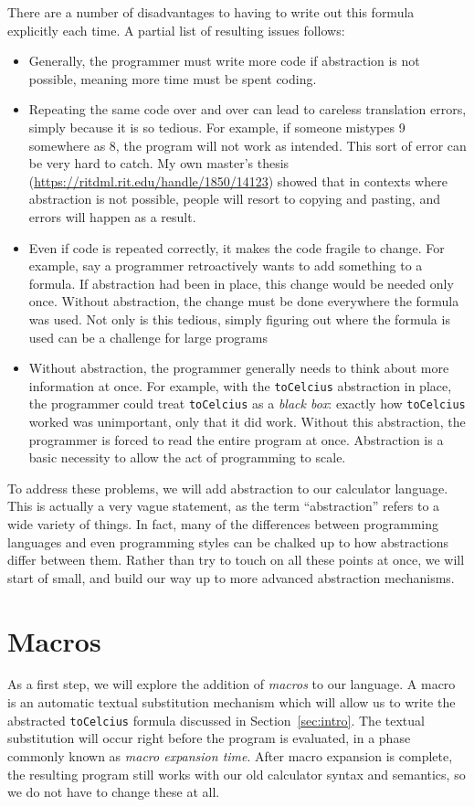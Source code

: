 \documentclass[nocopyrightspace]{sigplanconf}
\begin{document}
There are a number of disadvantages to having to write out this formula explicitly each time.
A partial list of resulting issues follows:
\begin{itemize}
  \item Generally, the programmer must write more code if abstraction is not possible, meaning more time must be spent coding.
  \item Repeating the same code over and over can lead to careless translation errors, simply because it is so tedious.
    For example, if someone mistypes 9 somewhere as 8, the program will not work as intended.
    This sort of error can be very hard to catch.
    My own master's thesis (\url{https://ritdml.rit.edu/handle/1850/14123}) showed that in contexts where abstraction is not possible, people will resort to copying and pasting, and errors will happen as a result.
  \item Even if code is repeated correctly, it makes the code fragile to change.
    For example, say a programmer retroactively wants to add something to a formula.
    If abstraction had been in place, this change would be needed only once.
    Without abstraction, the change must be done everywhere the formula was used.
    Not only is this tedious, simply figuring out where the formula is used can be a challenge for large programs
  \item Without abstraction, the programmer generally needs to think about more information at once.
    For example, with the {\tt toCelcius} abstraction in place, the programmer could treat {\tt toCelcius} as a \emph{black box}: exactly how {\tt toCelcius} worked was unimportant, only that it did work.
    Without this abstraction, the programmer is forced to read the entire program at once.
    Abstraction is a basic necessity to allow the act of programming to scale.
\end{itemize}

To address these problems, we will add abstraction to our calculator language.
This is actually a very vague statement, as the term ``abstraction'' refers to a wide variety of things.
In fact, many of the differences between programming languages and even programming styles can be chalked up to how abstractions differ between them.
Rather than try to touch on all these points at once, we will start of small, and build our way up to more advanced abstraction mechanisms.

\section{Macros}
As a first step, we will explore the addition of \emph{macros} to our language.
A macro is an automatic textual substitution mechanism which will allow us to write the abstracted {\tt toCelcius} formula discussed in Section~\ref{sec:intro}.
The textual substitution will occur right before the program is evaluated, in a phase commonly known as \emph{macro expansion time}.
After macro expansion is complete, the resulting program still works with our old calculator syntax and semantics, so we do not have to change these at all.
\end{document}
